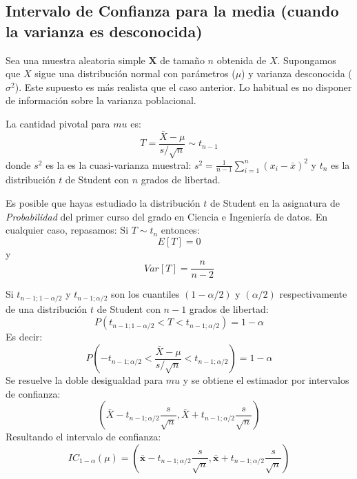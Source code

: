 \documentclass[
  letterpaper,
  DIV=11,
  numbers=noendperiod]{scrreprt}
\begin{document}
\hypertarget{intervalo-de-confianza-para-la-media-cuando-la-varianza-es-desconocida}{%
\subsection{Intervalo de Confianza para la media (cuando la varianza es
desconocida)}\label{intervalo-de-confianza-para-la-media-cuando-la-varianza-es-desconocida}}

Sea una muestra aleatoria simple \(\mathbf{X}\) de tamaño \(n\) obtenida
de \(X\). Supongamos que \(X\) sigue una distribución normal con
parámetros (\(\mu\)) y varianza desconocida (\(\sigma^2\)). Este
supuesto es más realista que el caso anterior. Lo habitual es no
disponer de información sobre la varianza poblacional.

La cantidad pivotal para \(mu\) es: \[
T=\frac{\bar{X}-\mu}{s/\sqrt{n}}\sim t_{n-1}
\] donde \(s^2\) es la es la cuasi-varianza muestral:
\(s^2=\frac{1}{n-1} \sum_{i=1}^n (x_i - \bar{x})^2\) y \(t_n\) es la
distribución \(t\) de Student con \(n\) grados de libertad.

\begin{tcolorbox}[enhanced jigsaw, arc=.35mm, breakable, coltitle=black, left=2mm, opacityback=0, bottomtitle=1mm, colbacktitle=quarto-callout-caution-color!10!white, title=\textcolor{quarto-callout-caution-color}{\faFire}\hspace{0.5em}{Repaso}, titlerule=0mm, colback=white, colframe=quarto-callout-caution-color-frame, bottomrule=.15mm, rightrule=.15mm, opacitybacktitle=0.6, toptitle=1mm, toprule=.15mm, leftrule=.75mm]

Es posible que hayas estudiado la distribución \(t\) de Student en la
asignatura de \emph{Probabilidad} del primer curso del grado en Ciencia
e Ingeniería de datos. En cualquier caso, repasamos: Si \(T\sim t_n\)
entonces: \[
E[T]=0
\] y \[
Var[T]=\frac{n}{n-2}
\]

\end{tcolorbox}

Si \(t_{n-1;1-\alpha/2}\) y \(t_{n-1;\alpha/2}\) son los cuantiles
\((1-\alpha/2)\) y \((\alpha/2)\) respectivamente de una distribución
\(t\) de Student con \(n-1\) grados de libertad: \[
P(t_{n-1;1-\alpha/2}<T<t_{n-1;\alpha/2})=1-\alpha
\] Es decir: \[
P(-t_{n-1;\alpha/2}<\frac{\bar{X}-\mu}{s/\sqrt{n}}<t_{n-1;\alpha/2})=1-\alpha
\] Se resuelve la doble desigualdad para \(mu\) y se obtiene el
estimador por intervalos de confianza: \[
\left ( \bar{X}-t_{n-1;\alpha/2}\frac{s}{\sqrt{n}}, \bar{X}+t_{n-1;\alpha/2}\frac{s}{\sqrt{n}} \right )
\] Resultando el intervalo de confianza: \[
IC_{1-\alpha}(\mu) = \left ( \bar{\mathbf{x}}-t_{n-1;\alpha/2}\frac{s}{\sqrt{n}}, \bar{\mathbf{x}}+t_{n-1;\alpha/2}\frac{s}{\sqrt{n}} \right )
\]
\end{document}
